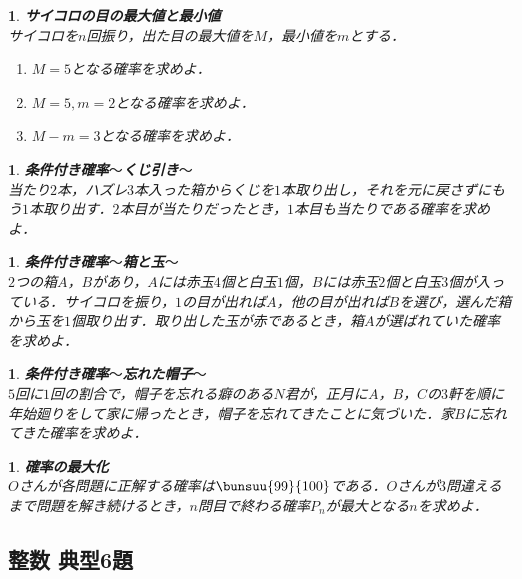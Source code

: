 \documentclass[10pt,
fleqn,
dvipdfmx,
uplatex
]{jsarticle}
\newtheorem{question}[Question]{}
\begin{document}
\begin{question}{\bf\boldmath サイコロの目の最大値と最小値}\\
サイコロを$n$回振り，出た目の最大値を$M$，最小値を$m$とする．
\begin{enumerate}
\item $M=5$となる確率を求めよ．
\item $M=5, m=2$となる確率を求めよ．
\item $M-m=3$となる確率を求めよ．
\end{enumerate}

\end{question}



\begin{question}{\bf\boldmath 条件付き確率$〜$くじ引き$〜$}\\
当たり$2$本，ハズレ$3$本入った箱からくじを$1$本取り出し，それを元に戻さずにもう$1$本取り出す．$2$本目が当たりだったとき，$1$本目も当たりである確率を求めよ．
\end{question}



\begin{question}{\bf\boldmath 条件付き確率$〜$箱と玉$〜$}\\
$2$つの箱$A$，$B$があり，$A$には赤玉$4$個と白玉$1$個，$B$には赤玉$2$個と白玉$3$個が入っている．サイコロを振り，$1$の目が出れば$A$，他の目が出れば$B$を選び，選んだ箱から玉を$1$個取り出す．取り出した玉が赤であるとき，箱$A$が選ばれていた確率を求めよ．

\end{question}



\begin{question}{\bf\boldmath 条件付き確率$〜$忘れた帽子$〜$}\\
$5$回に$1$回の割合で，帽子を忘れる癖のある$N$君が，正月に$A$，$B$，$C$の$3$軒を順に年始廻りをして家に帰ったとき，帽子を忘れてきたことに気づいた．家$B$に忘れてきた確率を求めよ．
\end{question}



\begin{question}{\bf\boldmath 確率の最大化}\\
$O$さんが各問題に正解する確率は$\bunsuu{{99}}{{100}}$である．$O$さんが$3$問違えるまで問題を解き続けるとき，$n$問目で終わる確率$P_n$が最大となる$n$を求めよ．
\end{question}

\subsection{整数 典型6題}
\end{document}
